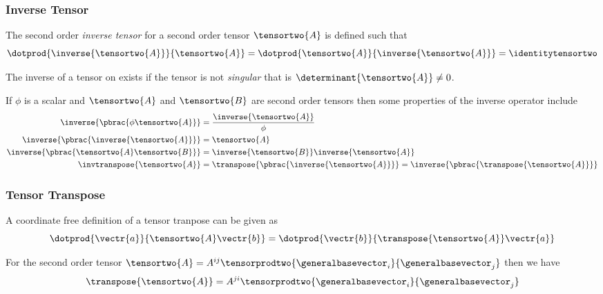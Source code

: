 \subsubsection{Inverse Tensor}
\label{subsubsec:InverseTensorSecondOrder}

The second order \emph{inverse tensor} for a second order tensor
$\tensortwo{A}$ is defined such that
\begin{equation}
  \dotprod{\inverse{\tensortwo{A}}}{\tensortwo{A}}=\dotprod{\tensortwo{A}}{\inverse{\tensortwo{A}}}=\identitytensortwo
\end{equation}

The inverse of a tensor on exists if the tensor is not \emph{singular} that is
$\determinant{\tensortwo{A}}\neq 0$.

If $\phi$ is a scalar and $\tensortwo{A}$ and $\tensortwo{B}$ are second order tensors then some
properties of the inverse operator include
\begin{align}
  \inverse{\pbrac{\phi\tensortwo{A}}}&=\dfrac{\inverse{\tensortwo{A}}}{\phi}
  \label{eqn:ScaleInverseTensorTwo} \\
  \inverse{\pbrac{\inverse{\tensortwo{A}}}}&=\tensortwo{A}
  \label{eqn:InverseInverseTensorTwo} \\
  \inverse{\pbrac{\tensortwo{A}\tensortwo{B}}}&=\inverse{\tensortwo{B}}\inverse{\tensortwo{A}}
  \label{eqn:ProductInverseTensorTwo} \\
  \invtranspose{\tensortwo{A}}&=\transpose{\pbrac{\inverse{\tensortwo{A}}}}=
  \inverse{\pbrac{\transpose{\tensortwo{A}}}}
  \label{eqn:InverseTransposeInverseTensorTwo}
\end{align}

\subsubsection{Tensor Transpose}
\label{subsubsec:TensorTransposeSecondOrder}

A coordinate free definition of a tensor tranpose can be given as
\begin{equation}
  \dotprod{\vectr{a}}{\tensortwo{A}\vectr{b}}=\dotprod{\vectr{b}}{\transpose{\tensortwo{A}}\vectr{a}}
\end{equation}

For the second order tensor
$\tensortwo{A}=A^{ij}\tensorprodtwo{\generalbasevector_{i}}{\generalbasevector_{j}}$ then we
have
\begin{equation}
  \transpose{\tensortwo{A}}=A^{ji}\tensorprodtwo{\generalbasevector_{i}}{\generalbasevector_{j}}
\end{equation}

